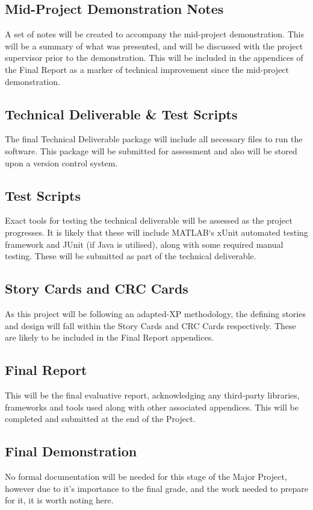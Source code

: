 \documentclass[11pt,fleqn,twoside]{article}
\begin{document}
\subsection{Mid-Project Demonstration Notes}
A set of notes will be created to accompany the mid-project demonstration. This will be a summary of what was presented, and will be discussed with the project supervisor prior to the demonstration. This will be included in the appendices of the Final Report as a marker of technical improvement since the mid-project demonstration.

\subsection{Technical Deliverable \& Test Scripts}
The final Technical Deliverable package will include all necessary files to run the software. This package will be submitted for assessment and also will be stored upon a version control system.

\subsection{Test Scripts}
Exact tools for testing the technical deliverable will be assessed as the project progresses. It is likely that these will include MATLAB`s xUnit automated testing framework and JUnit (if Java is utilised), along with some required manual testing. These will be submitted as part of the technical deliverable.

\subsection{Story Cards and CRC Cards}
As this project will be following an adapted-XP methodology, the defining stories and design will fall within the Story Cards and CRC Cards respectively. These are likely to be included in the Final Report appendices.

\subsection{Final Report}
This will be the final evaluative report, acknowledging any third-party libraries, frameworks and tools used along with other associated appendices. This will be completed and submitted at the end of the Project.

\subsection{Final Demonstration}
No formal documentation will be needed for this stage of the Major Project, however due to it's importance to the final grade, and the work needed to prepare for it, it is worth noting here.
\end{document}
